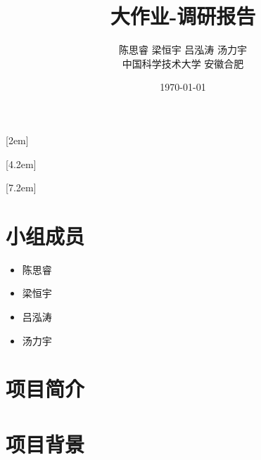 \documentclass[AutoFakeBold,a4paper]{ctexart}
\begin{document}
\title{\textbf{\Huge 大作业-调研报告}}

\author{陈思睿 \quad 梁恒宇 \quad 吕泓涛 \quad 汤力宇\\
中国科学技术大学 \quad 安徽合肥}

\date{\today}

\maketitle


[2em]{\addvspace{1.3mm}\bf}{%
\contentslabel{2.0em}}{}{\titlerule*[5pt]{$\cdot$}\contentspage}

[4.2em]{}{\contentslabel{2.5em}}{}{%
\titlerule*[5pt]{$\cdot$}\contentspage}

[7.2em]{}{\contentslabel{3.3em}}{}{%
\titlerule*[5pt]{$\cdot$}\contentspage}


    

\tableofcontents

\setcounter{page}{1}

\section{小组成员}

\begin{itemize}
    \item 陈思睿
    \item 梁恒宇
    \item 吕泓涛
    \item 汤力宇
\end{itemize}

\section{项目简介}

\section{项目背景}

\end{document}
